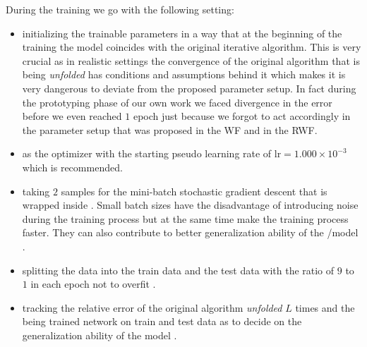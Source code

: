 During the training we go with the following setting:
\begin{itemize}
  \item initializing the trainable parameters in a way that at the beginning of the training the model coincides with the original iterative algorithm. 
  This is very crucial as in realistic settings the convergence of the original algorithm that is being \emph{unfolded} has conditions and 
  assumptions behind it which makes it is very dangerous to deviate from the proposed parameter setup. In fact during the prototyping phase of our own work 
  we faced divergence in the error before we even reached $1$ epoch 
  just because we forgot to act accordingly in the parameter setup that was proposed in the \ac{WF} and in the \ac{RWF}.    
  \item \adam\cite{Kingma2014}\index{\adam} as the optimizer with the starting 
  pseudo learning rate of $\mathrm{lr}=1.000\times10^{-3}$ which is 
  recommended\cite{Kingma2014}\cite{Sun2019}.
  \item taking $2$\cite{Masters2018} samples for the mini-batch stochastic gradient descent 
  that is wrapped inside \adam\cite{Kingma2014}\index{\adam}. Small batch sizes have the 
  disadvantage of introducing noise during the training process but at the same time make 
  the training process faster. They can also contribute to better generalization ability 
  of the \ml/\dl model \cite{Masters2018}.
  \item splitting the data into the train data and the test data with the ratio of $9$ to $1$ 
  in each epoch  not to overfit \cite{Goodfellow2016}\cite{Chollet2023}.
  \item tracking the relative error of the original algorithm \emph{unfolded} $L$ times 
  and the being trained network on train and test data as to decide on the generalization ability of the model \cite{Goodfellow2016}\cite{Chollet2023}.
\end{itemize}

